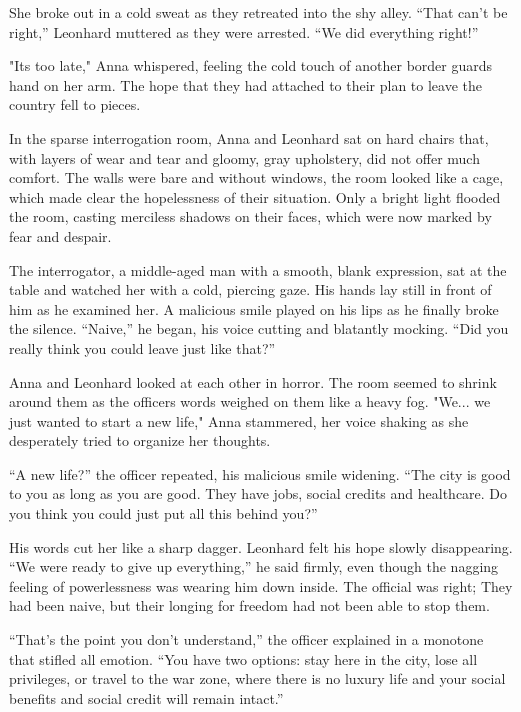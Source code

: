 \documentclass[
]{article}
\begin{document}
She broke out in a cold sweat as they retreated into the shy alley.
``That can't be right,'' Leonhard muttered as they were arrested. ``We
did everything right!''

"It\textquotesingle s too late," Anna whispered, feeling the cold touch
of another border guard\textquotesingle s hand on her arm. The hope that
they had attached to their plan to leave the country fell to pieces.

In the sparse interrogation room, Anna and Leonhard sat on hard chairs
that, with layers of wear and tear and gloomy, gray upholstery, did not
offer much comfort. The walls were bare and without windows, the room
looked like a cage, which made clear the hopelessness of their
situation. Only a bright light flooded the room, casting merciless
shadows on their faces, which were now marked by fear and despair.

The interrogator, a middle-aged man with a smooth, blank expression, sat
at the table and watched her with a cold, piercing gaze. His hands lay
still in front of him as he examined her. A malicious smile played on
his lips as he finally broke the silence. ``Naive,'' he began, his voice
cutting and blatantly mocking. ``Did you really think you could leave
just like that?''

Anna and Leonhard looked at each other in horror. The room seemed to
shrink around them as the officer\textquotesingle s words weighed on
them like a heavy fog. "We... we just wanted to start a new life," Anna
stammered, her voice shaking as she desperately tried to organize her
thoughts.

``A new life?'' the officer repeated, his malicious smile widening.
``The city is good to you as long as you are good. They have jobs,
social credits and healthcare. Do you think you could just put all this
behind you?''

His words cut her like a sharp dagger. Leonhard felt his hope slowly
disappearing. ``We were ready to give up everything,'' he said firmly,
even though the nagging feeling of powerlessness was wearing him down
inside. The official was right; They had been naive, but their longing
for freedom had not been able to stop them.

``That's the point you don't understand,'' the officer explained in a
monotone that stifled all emotion. ``You have two options: stay here in
the city, lose all privileges, or travel to the war zone, where there is
no luxury life and your social benefits and social credit will remain
intact.''
\end{document}
